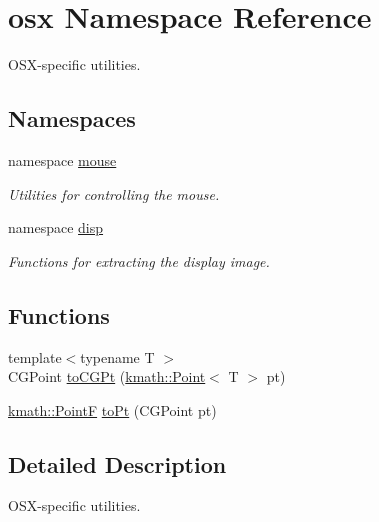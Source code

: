 \hypertarget{namespaceosx}{\section{osx Namespace Reference}
\label{namespaceosx}
}


O\-S\-X-\/specific utilities.  


\subsection*{Namespaces}
\begin{DoxyCompactItemize}
\item 
namespace \hyperlink{namespaceosx_1_1mouse}{mouse}
\begin{DoxyCompactList}\small\item\em Utilities for controlling the mouse. \end{DoxyCompactList}\item 
namespace \hyperlink{namespaceosx_1_1disp}{disp}
\begin{DoxyCompactList}\small\item\em Functions for extracting the display image. \end{DoxyCompactList}\end{DoxyCompactItemize}
\subsection*{Functions}
\begin{DoxyCompactItemize}
\item 
{\footnotesize template$<$typename T $>$ }\\C\-G\-Point \hyperlink{namespaceosx_abf7318d332d5e87088a270877f3da1ee}{to\-C\-G\-Pt} (\hyperlink{structkmath_1_1_point}{kmath\-::\-Point}$<$ T $>$ pt)
\item 
\hyperlink{namespacekmath_ad80aa80b21a1aeadbd484a0fc56f4e95}{kmath\-::\-Point\-F} \hyperlink{namespaceosx_a37f829bcbe1e218b01dafeb711bd9d42}{to\-Pt} (C\-G\-Point pt)
\end{DoxyCompactItemize}


\subsection{Detailed Description}
O\-S\-X-\/specific utilities. 

